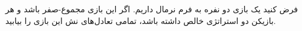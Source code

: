 فرض کنید یک بازی دو نفره به فرم نرمال داریم. اگر این بازی مجموع-صفر باشد و هر بازیکن دو استراتژی خالص داشته باشد، تمامی تعادل‌های نش این بازی را بیابید.